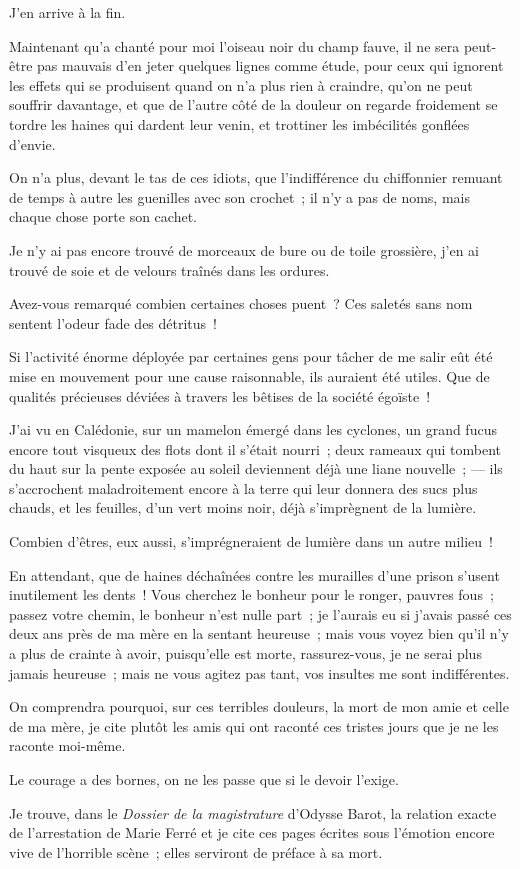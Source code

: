 \documentclass[french,twoside]{book} %
\newcommand\chaptercont{} %
\begin{document}
\chaptercont
\noindent J’en arrive à la fin.\par
Maintenant qu’a chanté pour moi l’oiseau noir du champ fauve, il ne sera peut-être pas mauvais d’en jeter quelques lignes comme étude, pour ceux qui ignorent les effets qui se produisent quand on n’a plus rien à craindre, qu’on ne peut souffrir davantage, et que de l’autre côté de la douleur on regarde froidement se tordre les haines qui dardent leur venin, et trottiner les imbécilités gonflées d’envie.\par
On n’a plus, devant le tas de ces idiots, que l’indifférence du chiffonnier remuant de temps à autre les guenilles avec son crochet ; il n’y a pas de noms, mais chaque chose porte son cachet.\par
Je n’y ai pas encore trouvé de morceaux de bure ou de toile grossière, j’en ai trouvé de soie et de velours traînés dans les ordures.\par
Avez-vous remarqué combien certaines choses  puent ? Ces saletés sans nom sentent l’odeur fade des détritus !\par
Si l’activité énorme déployée par certaines gens pour tâcher de me salir eût été mise en mouvement pour une cause raisonnable, ils auraient été utiles. Que de qualités précieuses déviées à travers les bêtises de la société égoïste !\par
J’ai vu en Calédonie, sur un mamelon émergé dans les cyclones, un grand fucus encore tout visqueux des flots dont il s’était nourri ; deux rameaux qui tombent du haut sur la pente exposée au soleil deviennent déjà une liane nouvelle ; — ils s’accrochent maladroitement encore à la terre qui leur donnera des sucs plus chauds, et les feuilles, d’un vert moins noir, déjà s’imprègnent de la lumière.\par
Combien d’êtres, eux aussi, s’imprégneraient de lumière dans un autre milieu !\par
En attendant, que de haines déchaînées contre les murailles d’une prison s’usent inutilement les dents ! Vous cherchez le bonheur pour le ronger, pauvres fous ; passez votre chemin, le bonheur n’est nulle part ; je l’aurais eu si j’avais passé ces deux ans près de ma mère en la sentant heureuse ; mais vous voyez bien qu’il n’y a plus de crainte à avoir, puisqu’elle est morte, rassurez-vous, je ne serai plus jamais heureuse ;  mais ne vous agitez pas tant, vos insultes me sont indifférentes.\par
On comprendra pourquoi, sur ces terribles douleurs, la mort de mon amie et celle de ma mère, je cite plutôt les amis qui ont raconté ces tristes jours que je ne les raconte moi-même.\par
Le courage a des bornes, on ne les passe que si le devoir l’exige.\par
Je trouve, dans le \emph{Dossier de la magistrature} d’Odysse Barot, la relation exacte de l’arrestation de Marie Ferré et je cite ces pages écrites sous l’émotion encore vive de l’horrible scène ; elles serviront de préface à sa mort.\par
\end{document}
